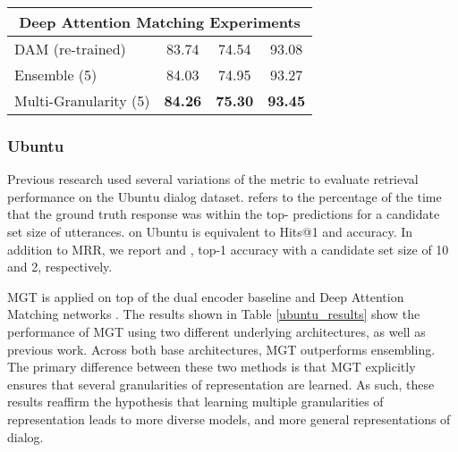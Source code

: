 \documentclass[11pt,a4paper]{article}
\begin{document}
\begin{table*}[]
\begin{tabular}{|l|c|c|c|}
\multicolumn{4}{|c|}{\textbf{Deep Attention Matching Experiments}} \\ \hline
DAM \citep{zhou2018multi} (re-trained)                 & 83.74                             & 74.54                              & 93.08                               \\ 
Ensemble  (5)                 & 84.03                             & 74.95                              & 93.27                               \\ 
Multi-Granularity (5)        & \textbf{84.26}                            & \textbf{75.30}                              & \textbf{93.45}                              \\ \hline


\end{tabular}
\caption{Results for next utterance retrieval on the Ubuntu dialog corpus. This table shows previous work, and experimental results with two underlying architectures: a dual encoder model and Deep Attention Matching networks.  The results shown in the DAM experiments section are performed with the open-sourced implementation of \citet{zhou2018multi}, which obtains slightly worse performance than they report. All bold-face results are statistically significant to .}
\label{ubuntu_results}
\end{table*}

\subsubsection{Ubuntu}

Previous research used several variations of the  metric to evaluate retrieval performance on the Ubuntu dialog dataset.  refers to the percentage of the time that the ground truth response was within the top- predictions for a candidate set size of  utterances.  on Ubuntu is equivalent to Hits@1 and accuracy. In addition to MRR, we report  and , top-1 accuracy with a candidate set size of 10 and 2, respectively.

MGT is applied on top of the dual encoder baseline \citep{lowe2015ubuntu} and Deep Attention Matching networks \citep{zhou2018multi}. The results shown in Table \ref{ubuntu_results} show the performance of MGT using two different underlying architectures, as well as previous work. Across both base architectures, MGT outperforms ensembling. The primary difference between these two methods is that MGT explicitly ensures that several granularities of representation are learned. As such, these results reaffirm the hypothesis that learning multiple granularities of representation leads to more diverse models, and more general representations of dialog.  
\end{document}
